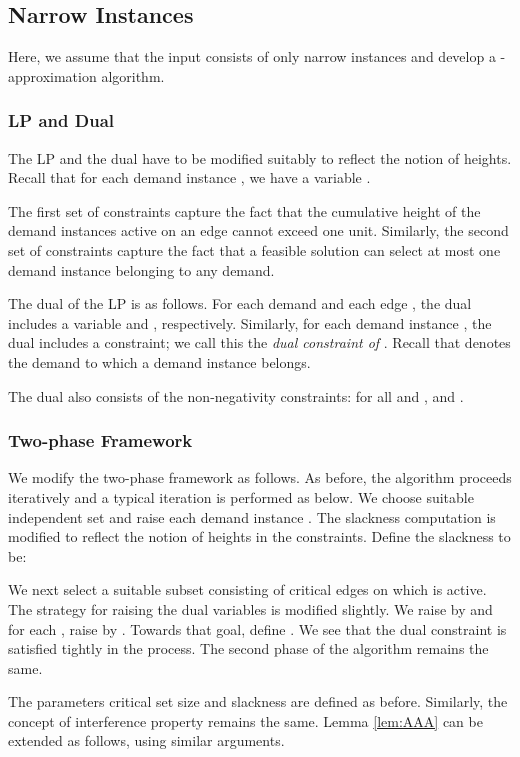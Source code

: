 \documentclass[11pt]{article}
\begin{document}
\subsection{Narrow Instances}
Here, we assume that the input consists of only narrow instances and develop a -approximation algorithm.

\subsubsection*{LP and Dual}
The LP and the dual have to be modified suitably to reflect the notion of heights.
Recall that for each demand instance , we have a variable .

The first set of constraints capture the fact that the cumulative height of the demand instances
active on an edge  cannot exceed one unit.
Similarly, the second set of constraints capture the fact that a feasible solution
can select at most one demand instance belonging to any demand.

The dual of the LP is as follows.
For each demand  and each edge , the dual includes a variable  and ,
respectively. Similarly, for each demand instance , 
the dual includes a constraint; we call this the {\em dual constraint of }.
Recall that  denotes the demand to which a demand instance  belongs.

The dual also consists of the non-negativity constraints: for all  and , 
and . 

\subsubsection*{Two-phase Framework}
We modify the two-phase framework as follows.
As before, the algorithm proceeds iteratively and a typical iteration is performed as below. 
We choose suitable independent set  and raise each demand instance .
The slackness computation is modified to reflect the notion of heights in the constraints.
Define the slackness to be:

We next select a suitable subset  consisting of critical edges on which  is active.
The strategy for raising the dual variables is modified slightly.
We raise  by  and for each , 
raise  by . Towards that goal, define .
We see that the dual constraint is satisfied tightly in the process.
The second phase of the algorithm remains the same.

The parameters critical set size  and slackness  are defined as before.
Similarly, the concept of interference property remains the same.
Lemma \ref{lem:AAA} can be extended as follows, using similar arguments.
\end{document}
